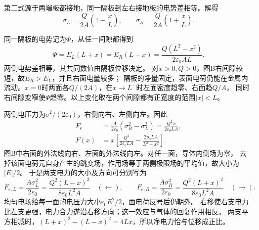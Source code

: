 \documentclass[UTF8,fontset=fandol,a4paper,11pt]{ctexart}
\begin{document}
第二式源于两端板都接地，同一隔板到左右接地板的电势差相等。解得
\[\sigma_L=\frac Q{2A}\left(1-\frac xL\right),\qquad
\sigma_R=\frac Q{2A}\left(1+\frac xL\right).
\]

同一隔板的电势记为$\Phi$，从任一间隙都得到
\[
\Phi=E_L(L+x)=E_R(L-x)
=\frac{Q(L^2-x^2)}{2\varepsilon_0AL}.
\]
两侧电势差相等，其共同数值由隔板位移决定。
对$x>0,Q>0$，图B右间隙较短，故$E_R>E_L$，并且右面电量较多；
隔板的净量固定，表面电荷仍能在金属内流动。$x=0$时两面各$Q/(2A)$，在$x\to L^-$时左面密度趋零、右面趋$Q/A$，
同时右间隙变窄使$\Phi$趋零。以上变化取在两个间隙都有正宽度的范围$|x|<L$。

两侧电压力为$\sigma^2/(2\varepsilon_0)$，右侧向右、左侧向左。因此
\begin{align*}
F_e&=\frac A{2\varepsilon_0}(\sigma_R^2-\sigma_L^2)
=\frac{Q^2x}{2\varepsilon_0LA},\\
F(x)&=x\left[\frac{Q^2}{2\varepsilon_0LA}-\frac{2p_0LA}{L^2-x^2}\right].
\end{align*}
图B中右面的外法线向右、左面的外法线向左。对任一面，导体内侧场为零，
去掉该面电荷元自身产生的跳变场，作用场等于两侧极限场的平均值，故大小为$|E|/2$。
于是两支电力的大小及方向可分别写为
\[
F_{e,L}=\frac{A\sigma_L^2}{2\varepsilon_0}
=\frac{Q^2(L-x)^2}{8\varepsilon_0L^2A}\quad(\leftarrow),\qquad
F_{e,R}=\frac{A\sigma_R^2}{2\varepsilon_0}
=\frac{Q^2(L+x)^2}{8\varepsilon_0L^2A}\quad(\rightarrow).
\]
均匀电场给每一面的电压力大小$\varepsilon_0 E^2/2$，面电荷反号后仍朝外。
右移使右支电力比左支更强，电力合力遂沿右移方向；这一效应与气体的回复作用相反。
两支平方相减时，$(L+x)^2-(L-x)^2=4Lx$，所以净电力恰与位移成正比。
\end{document}
